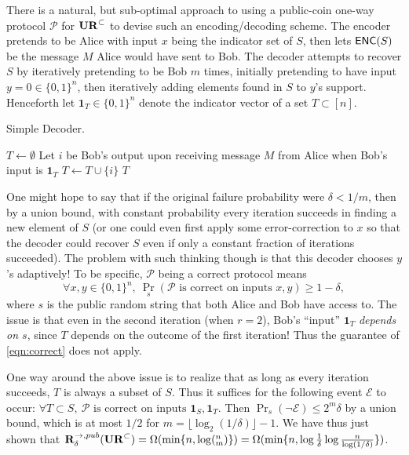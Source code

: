 There is a natural, but sub-optimal approach to using a public-coin one-way protocol $\mathcal{P}$ for $\mathbf{UR}^\subset$ to devise such an encoding/decoding scheme.  The encoder pretends to be Alice with input $x$ being the indicator set of $S$, then lets $\textsf{ENC}(S)$ be the message $M$ Alice would have sent to Bob. The decoder attempts to recover $S$ by iteratively pretending to be Bob $m$ times, initially pretending to have input $y=0\in\{0,1\}^n$, then iteratively adding elements found in $S$ to $y$'s support. Henceforth let $\mathbf{1}_T\in\{0,1\}^n$ denote the indicator vector of a set $T\subset[n]$.

\begin{algorithm}[H] 
  \caption{Simple Decoder.} \label{algo:wrong}
  \begin{algorithmic}[1]
    \State $T\leftarrow \emptyset$
      \State Let $i$ be Bob's output upon receiving message $M$ from Alice when Bob's input is $\mathbf{1}_T$
      \State $T \leftarrow T \cup\{i\}$
    \EndFor
    \State \Return $T$
    \EndProcedure
  \end{algorithmic}
\end{algorithm}

One might hope to say that if the original failure probability were $\delta < 1/m$, then by a union bound, with constant probability every iteration succeeds in finding a new element of $S$ (or one could even first apply some error-correction to $x$ so that the decoder could recover $S$ even if only a constant fraction of iterations succeeded). The problem with such thinking though is that this decoder chooses $y$'s adaptively! To be specific, $\mathcal{P}$ being a correct protocol means
\begin{equation}
\forall x,y\in\{0,1\}^n,\ \Pr_s(\mathcal{P}\text{ is correct on inputs }x,y) \ge 1-\delta , \label{eqn:correct}
\end{equation}
where $s$ is the public random string that both Alice and Bob have access to. The issue is that even in the second iteration (when $r=2$), Bob's ``input'' $\mathbf{1}_T$ {\em depends on $s$}, since $T$ depends on the outcome of the first iteration! Thus the guarantee of \eqref{eqn:correct} does not apply.

One way around the above issue is to realize that as long as every iteration succeeds, $T$ is always a subset of $S$. Thus it suffices for the following event $\mathcal{E}$ to occur: $\forall T\subset S,\ \mathcal{P}\text{ is correct on inputs }\mathbf{1}_S, \mathbf{1}_T$. Then $\Pr_s(\neg \mathcal{E}) \le 2^m\delta$ by a union bound, which is at most $1/2$ for $m = \lfloor \log_2(1/\delta)\rfloor - 1$. We have thus just shown that $\mathbf{R}^{\rightarrow,pub}_\delta(\mathbf{UR}^\subset) = \Omega(\min\{n, \log(^n_m)\}) = \Omega(\min\{n, \log\frac 1{\delta}\log \frac n{\log(1/\delta)}\})$.


